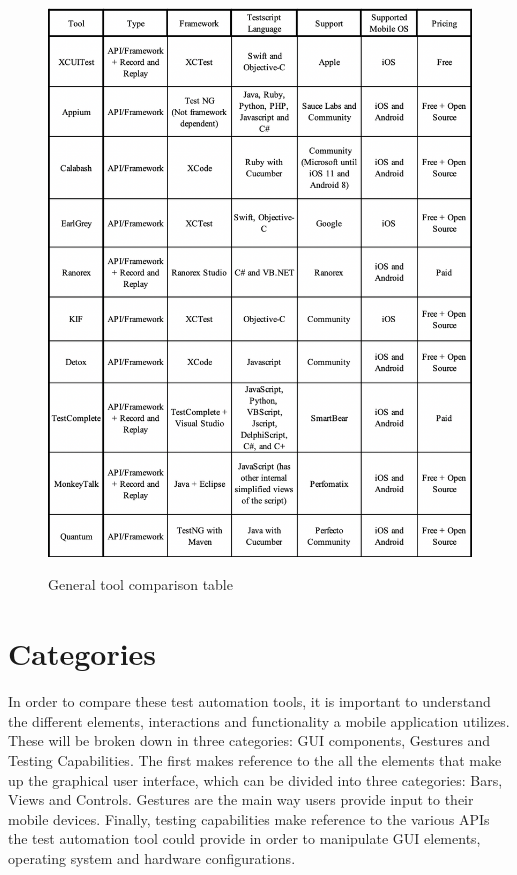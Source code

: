 \begin{figure}[h!]
	\centering
	\includegraphics[width=12cm]{img/table1.png} \\[0mm]
	\vspace{0cm}
	\caption{General tool comparison table}
	\label{Toolcomparison}
\end{figure} 

\section{Categories}
In order to compare these test automation tools, it is important to understand the different elements, interactions and functionality a mobile application utilizes. These will be broken down in three categories: GUI components, Gestures and Testing Capabilities. The first makes reference to the all the elements that make up the graphical user interface, which can be divided into three categories: Bars, Views and Controls. Gestures are the main way users provide input to their mobile devices. Finally, testing capabilities make reference to the various APIs the test automation tool could provide in order to manipulate GUI elements, operating system and hardware configurations.

